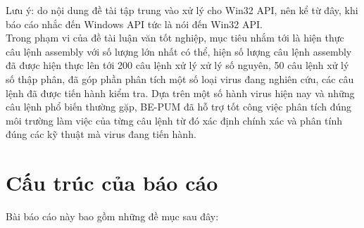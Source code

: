 Lưu ý: do nội dung đề tài tập trung vào xử lý cho Win32 API, nên kể từ đây, khi báo cáo nhắc đến Windows API tức là nói đến Win32 API.\\

Trong phạm vi của đề tài luận văn tốt nghiệp, mục tiêu nhắm tới là hiện thực câu lệnh assembly với số lượng lớn nhất có thể, hiện số lượng câu lệnh assembly đã được hiện thực lên tới 200 câu lệnh xử lý xử lý số nguyên, 50 câu lệnh xử lý số thập phân, đã góp phần phân tích một số loại virus đang nghiên cứu, các câu lệnh đã được tiến hành kiểm tra. Dựa trên một số hành virus hiện nay và những câu lệnh phổ biến thường gặp, BE-PUM đã hỗ trợ tốt công việc phân tích đúng môi trường làm việc của từng câu lệnh từ đó xác định chính xác và phân tính đúng các kỹ thuật mà virus đang tiến hành.\\

\newpage
\section{Cấu trúc của báo cáo}

Bài báo cáo này bao gồm những đề mục sau đây:

